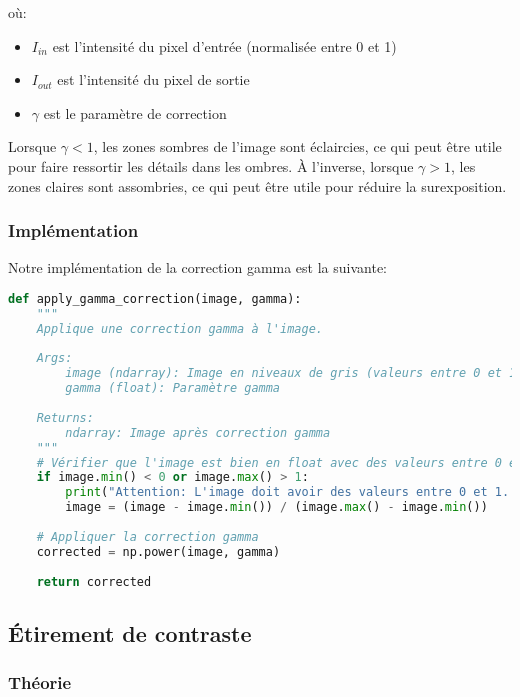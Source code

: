 \documentclass[12pt,a4paper]{article}
\begin{document}
où:
\begin{itemize}
    \item $I_{in}$ est l'intensité du pixel d'entrée (normalisée entre 0 et 1)
    \item $I_{out}$ est l'intensité du pixel de sortie
    \item $\gamma$ est le paramètre de correction
\end{itemize}

Lorsque $\gamma < 1$, les zones sombres de l'image sont éclaircies, ce qui peut être utile pour faire ressortir les détails dans les ombres. À l'inverse, lorsque $\gamma > 1$, les zones claires sont assombries, ce qui peut être utile pour réduire la surexposition.

\subsubsection{Implémentation}

Notre implémentation de la correction gamma est la suivante:

\begin{lstlisting}[language=Python, caption=Implémentation de la correction gamma]
def apply_gamma_correction(image, gamma):
    """
    Applique une correction gamma à l'image.
    
    Args:
        image (ndarray): Image en niveaux de gris (valeurs entre 0 et 1)
        gamma (float): Paramètre gamma
        
    Returns:
        ndarray: Image après correction gamma
    """
    # Vérifier que l'image est bien en float avec des valeurs entre 0 et 1
    if image.min() < 0 or image.max() > 1:
        print("Attention: L'image doit avoir des valeurs entre 0 et 1. Normalisation appliquée.")
        image = (image - image.min()) / (image.max() - image.min())
    
    # Appliquer la correction gamma
    corrected = np.power(image, gamma)
    
    return corrected
\end{lstlisting}

\subsection{Étirement de contraste}

\subsubsection{Théorie}
\end{document}
